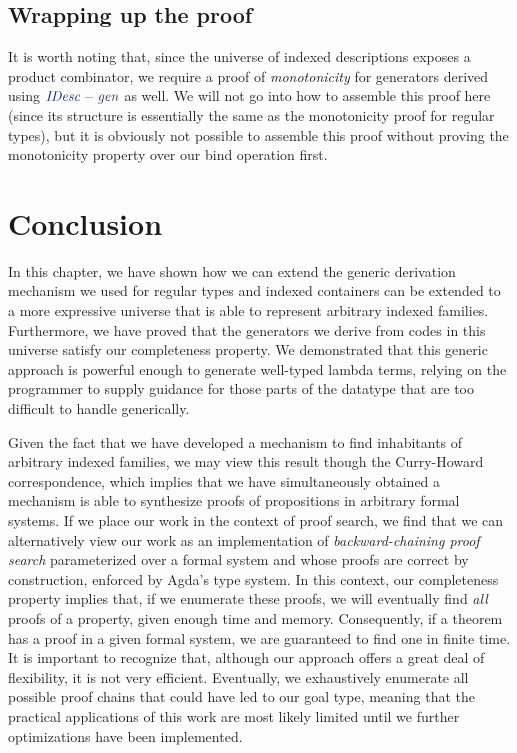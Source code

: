 \documentclass[a4paper,msc,twosized=semi]{uustthesis}
\newcommand*{\mathcolor}{}
\def\mathcolor#1#{\mathcoloraux{#1}}
\newcommand*{\mathcoloraux}[3]{%
  \protect\leavevmode
  \begingroup
    \color#1{#2}#3%
  \endgroup
}
\newcommand{\HSSym}[1]{\mathcolor{hsblue4}{#1}}
\newcommand{\HSCon}[1]{\mathcolor{hsblue3}{\mathit{#1}}}
\newcommand{\HSVar}[1]{\mathcolor{hsblue5}{\mathit{#1}}}
\begin{document}
\subsection{Wrapping up the proof}

  It is worth noting that, since the universe of indexed descriptions exposes a 
  product combinator, we require a proof of \emph{monotonicity} for generators derived 
  using \ensuremath{\HSCon{IDesc}\HSSym{-}\HSVar{gen}} as well. We will not go into how to assemble this proof here 
  (since its structure is essentially the same as the monotonicity proof for regular 
  types), but it is obviously not possible to assemble this proof without proving the 
  monotonicity property over our bind operation first. 

\section*{Conclusion}

  In this chapter, we have shown how we can extend the generic derivation mechanism we 
  used for regular types and indexed containers can be extended to a more expressive 
  universe that is able to represent arbitrary indexed families. Furthermore, we have 
  proved that the generators we derive from codes in this universe satisfy our 
  completeness property. We demonstrated that this generic approach is powerful enough 
  to generate well-typed lambda terms, relying on the programmer to supply guidance 
  for those parts of the datatype that are too difficult to handle generically. 

  Given the fact that we have developed a mechanism to find inhabitants of arbitrary 
  indexed families, we may view this result though the Curry-Howard correspondence, 
  which implies that we have simultaneously obtained a mechanism is able to synthesize 
  proofs of propositions in arbitrary formal systems. If we place our work in the 
  context of proof search, we find that we can alternatively view our work as an 
  implementation of \emph{backward-chaining proof search} \cite{miller1991uniform} 
  parameterized over a formal system and whose proofs are correct by construction, 
  enforced by Agda's type system. In this context, our completeness property implies 
  that, if we enumerate these proofs, we will eventually find \emph{all} proofs of a 
  property, given enough time and memory. Consequently, if a theorem has a proof in a 
  given formal system, we are guaranteed to find one in finite time. It is important 
  to recognize that, although our approach offers a great deal of flexibility, it is 
  not very efficient. Eventually, we exhaustively enumerate all possible proof chains 
  that could have led to our goal type, meaning that the practical applications of 
  this work are most likely limited until we further optimizations have been 
  implemented. 
\end{document}
